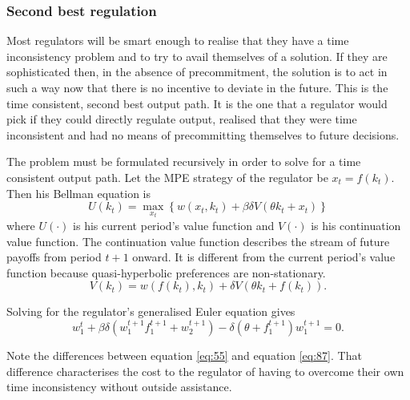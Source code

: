 \subsubsection{Second best regulation}
\label{sec:second-best-regul}

Most regulators will be smart enough to realise that they have a time
inconsistency problem and to try to avail themselves of a
solution. If they are sophisticated then, in the absence of
precommitment, the solution is to act in such a way now that there
is no incentive to deviate in the future. This is the time consistent,
second best output path. It is the one that a regulator would pick if
they could directly regulate output, realised that they were time
inconsistent and had no means of precommitting themselves to future
decisions.

The problem must be formulated recursively in order to solve for a
time consistent output path. Let the MPE strategy of the regulator be
$x_t = f(k_t)$. Then his Bellman equation is
\begin{equation}
  \label{eq:51}
  U(k_t) = \max_{x_t} \left\{ w(x_t,k_t)
    + \beta\delta V( \theta k_t + x_t) \right\}
\end{equation}
where $U(\cdot)$ is his current period's value function and $V(\cdot)$
is his continuation value function. The continuation value function
describes the stream of future payoffs from period $t+1$ onward. It is
different from the current period's value function because
quasi-hyperbolic preferences are non-stationary.
\begin{equation}
  \label{eq:52}
  V(k_t) = w\left( f(k_t),k_t\right) +
  \delta V\left( \theta k_t + f(k_t) \right).
\end{equation}

Solving for the regulator's generalised Euler equation gives
\begin{equation}
  \label{eq:55}
  w^t_1 + \beta\delta( w^{t+1}_1 f^{t+1}_1
  + w^{t+1}_2 ) - \delta (\theta + f^{t+1}_1)w^{t+1}_1 = 0.
\end{equation}

Note the differences between equation \eqref{eq:55} and equation
\eqref{eq:87}. That difference characterises the cost to the regulator
of having to overcome their own time inconsistency without outside
assistance.






